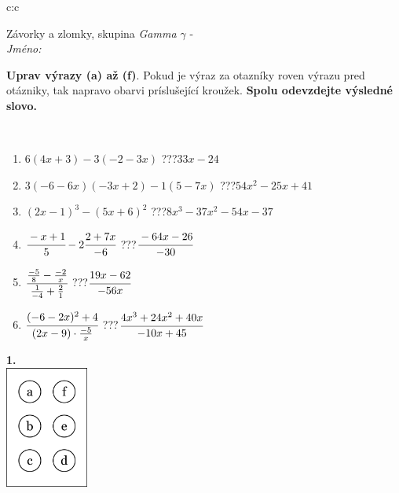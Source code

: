 \documentclass[10pt]{report}
\begin{document}
\begin{tabular}{c:c}
\begin{minipage}[c][104.5mm][t]{0.5\linewidth}
\begin{center}
\vspace{7mm}
{\huge Závorky a zlomky, skupina \textit{Gamma $\gamma$} -}\\[5mm]
\textit{Jméno:}\phantom{xxxxxxxxxxxxxxxxxxxxxxxxxxxxxxxxxxxxxxxxxxxxxxxxxxxxxxxxxxxxxxxxx}\\[5mm]
\begin{minipage}{0.95\linewidth}
\begin{center}
\textbf{Uprav výrazy (a) až (f)}. Pokud je výraz za otazníky roven výrazu pred otázniky, tak napravo obarvi príslušející kroužek. \textbf{Spolu odevzdejte výsledné slovo.}
\end{center}
\end{minipage}
\\[1mm]
\begin{minipage}{0.79\linewidth}
\begin{center}
\begin{varwidth}{\linewidth}
\begin{enumerate}
\normalsize
\item $6(4x+3)-3(-2-3x)$\quad \dotfill\; ???\;\dotfill \quad $33x-24$
\item $3(-6-6x)(-3x+2)-1(5-7x)$\quad \dotfill\; ???\;\dotfill \quad $54x^2-25x+41$
\item $(2x-1)^3-(5x+6)^2$\quad \dotfill\; ???\;\dotfill \quad $8x^3-37x^2-54x-37$
\item $\cfrac{-x+1}{5}-2\cfrac{2+7x}{-6}$\quad \dotfill\; ???\;\dotfill \quad $\cfrac{-64x-26}{-30}$
\item $\cfrac{\frac{-5}{8}-\frac{-2}{x}}{\frac{1}{-4}+\frac{2}{1}}$\quad \dotfill\; ???\;\dotfill \quad $\cfrac{19x-62}{-56x}$
\item $\cfrac{(-6-2x)^2+4}{(2x-9)\cdot\frac{-5}{x}}$\quad \dotfill\; ???\;\dotfill \quad $\cfrac{4x^3+24x^2+40x}{-10x+45}$
\end{enumerate}
\end{varwidth}
\end{center}
\end{minipage}
\begin{minipage}{0.20\linewidth}
\begin{center}
{\Huge\bfseries 1.} \\[2mm]
\includegraphics[height=40mm]{../images/braille.png}

\end{center}
\end{minipage}
\end{center}
\end{minipage}
\end{tabular}
\end{document}
